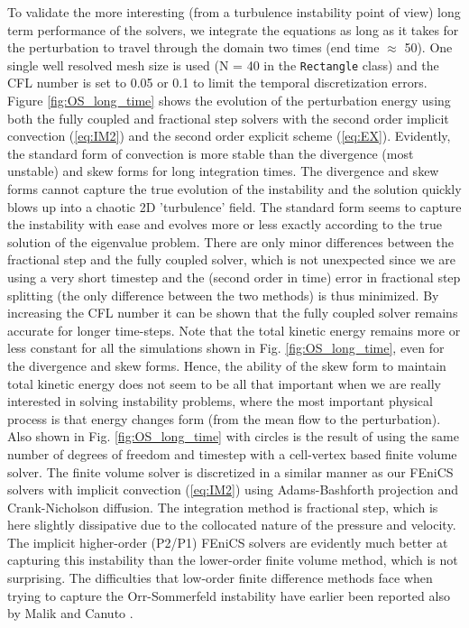 To validate the more interesting (from a turbulence instability point of view) long term performance of the solvers, we integrate the equations as long as it takes for the perturbation to travel through the domain two times (end time $\approx$ 50). One single well resolved mesh size is used (N = 40 in the {\fontsize{12pt}{12pt}\texttt{Rectangle}} class) and the CFL number is set to 0.05 or 0.1 to limit the temporal discretization errors. Figure \ref{fig:OS_long_time} shows the evolution of the perturbation energy using both the fully coupled and fractional step solvers with the second order implicit convection (\ref{eq:IM2}) and the second order explicit scheme (\ref{eq:EX}). Evidently, the standard form of convection is more stable than the divergence (most unstable) and skew forms for long integration times. The divergence and skew forms cannot capture the true evolution of the instability and the solution quickly blows up into a chaotic 2D 'turbulence' field. The standard form seems to capture the instability with ease and evolves more or less exactly according to the true solution of the eigenvalue problem. There are only minor differences between the fractional step and the fully coupled solver, which is not unexpected since we are using a very short timestep and the (second order in time) error in fractional step splitting (the only difference between the two methods) is thus minimized. By increasing the CFL number it can be shown that the fully coupled solver remains accurate for longer time-steps. Note that the total kinetic energy remains more or less constant for all the simulations shown in Fig. \ref{fig:OS_long_time}, even for the divergence and skew forms. Hence, the ability of the skew form to maintain total kinetic energy does not seem to be all that important when we are really interested in solving instability problems, where the most important physical process is that energy changes form (from the mean flow to the perturbation). Also shown in Fig. \ref{fig:OS_long_time} with circles is the result of using the same number of degrees of freedom and timestep with a cell-vertex based finite volume solver. The finite volume solver is discretized in a similar manner as our FEniCS solvers with implicit convection (\ref{eq:IM2}) using Adams-Bashforth projection and Crank-Nicholson diffusion. The integration method is fractional step, which is here slightly dissipative due to the collocated nature of the pressure and velocity. The implicit higher-order (P2/P1) FEniCS solvers are evidently much better at capturing this instability than the lower-order finite volume method, which is not surprising. The difficulties that low-order finite difference methods face when trying to capture the Orr-Sommerfeld instability have earlier been reported also by Malik \cite{Malik1984} and Canuto \cite{canuto07}.
